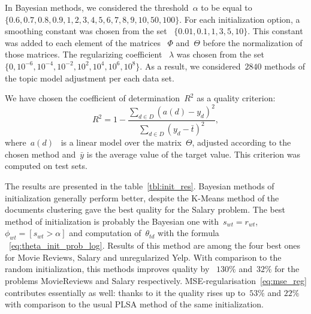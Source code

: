 \documentclass{sig-alternate-2013}
\begin{document}
In Bayesian methods, we considered the threshold~$\alpha$ to be equal to $\{0.6, 0.7, 0.8, 0.9, 1, 2, 3, 4, 5, 6, 7, 8, 9, 10, 50, 100\}$. For each initialization option, a smoothing constant was chosen from the set ~$\{0.01, 0.1, 1, 3, 5, 10\}$. This constant was added to each element of the matrices ~$\Phi$ and~$\Theta$ before the normalization of those matrices. The regularizing coefficient ~$\lambda$ was chosen from the set ~$\{0, 10^{-6}, 10^{-4}, 10^{-2}, 10^2, 10^4, 10^6, 10^8\}$.
As a result, we considered~$2840$ methods of the topic model adjustment per each data set.

We have chosen the coefficient of determination~$R^2$ as a quality criterion:
\[
    R^2
    =
    1
    -
    \frac{
        \sum_{d \in D} (a(d) - y_d)^2
    }{
        \sum_{d \in D} (y_d - \bar t)^2
    },
\]
where~$a(d)$~ is a linear model over the matrix~$\Theta$, adjusted
according to the chosen method and~$\bar y$ is the average value of the target value. This criterion was computed on test sets.


The results are presented in the table~\ref{tbl:init_res}.
Bayesian methods of initialization generally perform better, despite the K-Means method of the documents clustering gave the best quality for the Salary problem. The best method of initialization is probably the Bayesian one with~$s_{wt} = r_{wt}$,
$\phi_{wt} = [s_{wt} > \alpha]$ and computation of~$\theta_{td}$ with the formula ~\eqref{eq:theta_init_prob_log}. Results of this method are among the four best ones for Movie Reviews, Salary and unregularized Yelp. With comparison to the random initialization, this methods improves quality by ~$130\%$ and~$32\%$ for the problems MovieReviews and Salary respectively. MSE-regularisation~\eqref{eq:mse_reg} contributes essentially as well:
thanks to it the quality rises up to~$53\%$ and $22\%$ with comparison to the usual PLSA method of the same initialization.
\end{document}
